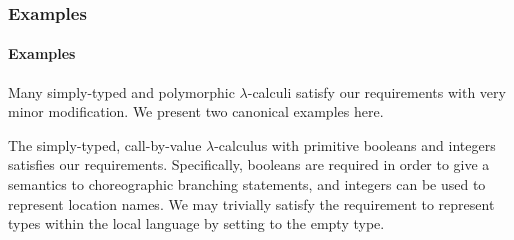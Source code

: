 \iftr\subsubsection{Examples}\else\paragraph{Examples}\fi
\label{sec:loc-lang-examples}
Many simply-typed and polymorphic $\lambda$-calculi satisfy our requirements with very minor modification.
We present two canonical examples here.

\begin{ex}
  \label{ex:st-lambda}
  The simply-typed, call-by-value $\lambda$-calculus with primitive booleans and integers satisfies our requirements.
  Specifically, booleans are required in order to give a semantics to choreographic branching statements, and integers can be used to represent location names.
  We may trivially satisfy the requirement to represent types within the local language by setting \Typ to the empty type.


\end{ex}

